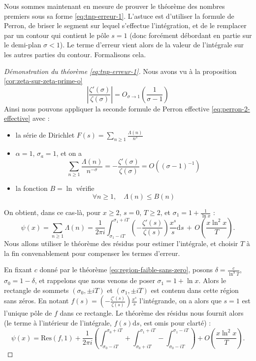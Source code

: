 \documentclass[french]{report}
\begin{document}
Nous sommes maintenant en mesure de prouver le théorème des nombres premiers sous sa forme \ref{eq:tnp-erreur-1}. L'astuce est d'utiliser la formule de Perron, de briser le segment sur lequel s'effectue l'intégration, et de le remplacer par un contour qui contient le pôle $s=1$ (donc forcément débordant en partie sur le demi-plan $\sigma<1$). Le terme d'erreur vient alors de la valeur de l'intégrale sur les autres parties du contour. Formalisons cela.

\begin{proof}[Démonstration du théorème \ref{eq:tnp-erreur-1}]
  Nous avons vu à la proposition \ref{cor:zeta-sur-zeta-prime-o} 
  \[ \left|\frac{\zeta'(\sigma)}{\zeta(\sigma)}\right| = O_{\sigma\to1}\left(\frac{1}{\sigma-1}\right) \]
  Ainsi nous pouvons appliquer la seconde formule de Perron effective \ref{eq:perron-2-effective} avec :
  \begin{itemize}
    \item la série de Dirichlet $F(s)=\sum_{n\geq1}\frac{\Lambda(n)}{n^s}$
    \item $\alpha=1$, $\sigma_a=1$, et on a
      \[
        \sum_{n\geq1}\frac{\Lambda(n)}{n^{-\sigma}}
        = -\frac{\zeta'(\sigma)}{\zeta(\sigma)}
        = O((\sigma-1)^{-1})
        \]
    \item la fonction $B=\ln$ vérifie
    \[ \forall n\geq1,\quad\Lambda(n)\leq B(n) \]
  \end{itemize}
  On obtient, dans ce cas-là, pour $x\geq2$, $s=0$, $T\geq2$, et $\sigma_1=1+\frac{1}{\ln x}$ :
  \[ \psi(x) = \sum_{n\geq1}\Lambda(n) = \frac{1}{2\pi i}\int_{\sigma_1-iT}^{\sigma_1+iT}\left(-\frac{\zeta'(s)}{\zeta(s)}\right)\frac{x^s}{s}\mathrm{d}s\,+\,O\left(\frac{x\ln^2 x}{T}\right). \]
  Nous allons utiliser le théorème des résidus pour estimer l'intégrale, et choisir $T$ à la fin convenablement pour compenser les termes d'erreur.

  En fixant $c$ donné par le théorème \ref{eq:region-faible-sans-zero}, posons $\delta=\frac{c}{\ln^9T}$, $\sigma_0=1-\delta$, et rappelons que nous venons de poser $\sigma_1=1+\ln x$. Alors le rectangle de sommets $(\sigma_0,\pm iT)$ et $(\sigma_1,\pm iT)$ est contenu dans cette région sans zéros. En notant $f(s)=\left(-\frac{\zeta'(s)}{\zeta(s)}\right)\frac{x^s}{s}$ l'intégrande, on a alors que $s=1$ est l'unique pôle de $f$ dans ce rectangle. Le théorème des résidus nous fournit alors (le terme à l'intérieur de l'intégrale, $f(s)\mathrm{d}s$, est omis pour clarté) :
  \[ \psi(x) = \mathrm{Res}(f,1) + \frac{1}{2\pi i}\left(
    \int_{\sigma_0-iT}^{\sigma_0+iT}
    +\int_{\sigma_0+iT}^{\sigma_1+iT}
    -\int_{\sigma_0-iT}^{\sigma_1-iT}
    \right)
    +O\left(\frac{x\ln^2x}{T}\right). \]


\end{proof}
\end{document}
